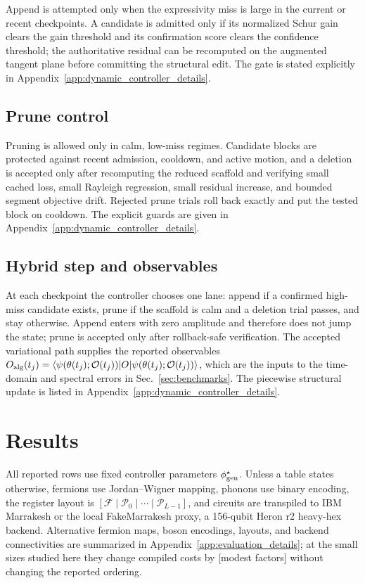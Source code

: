 \documentclass[
  reprint,
  amsmath,
  amssymb,
  aps,
  pra,
  nofootinbib,
  superscriptaddress,
  floatfix
]{revtex4-2}
\newcommand{\placeholder}[1]{\textcolor{red!70!black}{\ifmmode\left[#1\right]\else\textsf{[#1]}\fi}}
\newcommand{\Oset}{\mathcal{O}}
\newcommand{\ket}[1]{|#1\rangle}
\newcommand{\bra}[1]{\langle #1|}
\begin{document}
Append is attempted only when the expressivity miss is large in the current or recent checkpoints. A candidate is admitted only if its normalized Schur gain clears the gain threshold and its confirmation score clears the confidence threshold; the authoritative residual can be recomputed on the augmented tangent plane before committing the structural edit. The gate is stated explicitly in Appendix~\ref{app:dynamic_controller_details}.

\subsection{Prune control}

Pruning is allowed only in calm, low-miss regimes. Candidate blocks are protected against recent admission, cooldown, and active motion, and a deletion is accepted only after recomputing the reduced scaffold and verifying small cached loss, small Rayleigh regression, small residual increase, and bounded segment objective drift. Rejected prune trials roll back exactly and put the tested block on cooldown. The explicit guards are given in Appendix~\ref{app:dynamic_controller_details}.

\subsection{Hybrid step and observables}

At each checkpoint the controller chooses one lane: append if a confirmed high-miss candidate exists, prune if the scaffold is calm and a deletion trial passes, and stay otherwise. Append enters with zero amplitude and therefore does not jump the state; prune is accepted only after rollback-safe verification. The accepted variational path supplies the reported observables $O_{\rm alg}(t_j)=\bra{\psi(\theta(t_j);\Oset(t_j))}O\ket{\psi(\theta(t_j);\Oset(t_j))}$, which are the inputs to the time-domain and spectral errors in Sec.~\ref{sec:benchmarks}. The piecewise structural update is listed in Appendix~\ref{app:dynamic_controller_details}.

\section{Results}
\label{sec:results}
\label{sec:benchmarks}

All reported rows use fixed controller parameters $\phi_{\rm gen}^{\star}$. Unless a table states otherwise, fermions use Jordan--Wigner mapping, phonons use binary encoding, the register layout is $[\mathcal F\mid\mathcal P_0\mid\cdots\mid\mathcal P_{L-1}]$, and circuits are transpiled to IBM Marrakesh or the local FakeMarrakesh proxy, a 156-qubit Heron r2 heavy-hex backend. Alternative fermion maps, boson encodings, layouts, and backend connectivities are summarized in Appendix~\ref{app:evaluation_details}; at the small sizes studied here they change compiled costs by \placeholder{modest factors} without changing the reported ordering.
\end{document}

